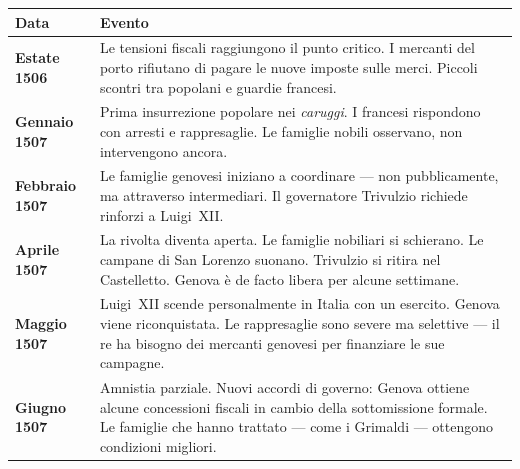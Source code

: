 \begin{center}
\begin{tabularx}{\textwidth}{L{3.2cm} X}
  \toprule
  \textbf{Data} & \textbf{Evento} \\
  \midrule
  \textbf{Estate 1506} &
    Le tensioni fiscali raggiungono il punto critico. I mercanti del porto
    rifiutano di pagare le nuove imposte sulle merci. Piccoli scontri tra
    popolani e guardie francesi. \\

  \textbf{Gennaio 1507} &
    Prima insurrezione popolare nei \textit{caruggi}. I francesi rispondono
    con arresti e rappresaglie. Le famiglie nobili osservano, non intervengono
    ancora. \\

  \textbf{Febbraio 1507} &
    Le famiglie genovesi iniziano a coordinare — non pubblicamente, ma
    attraverso intermediari. Il governatore Trivulzio richiede rinforzi
    a Luigi~XII. \\

  \textbf{Aprile 1507} &
    La rivolta diventa aperta. Le famiglie nobiliari si schierano.
    Le campane di San Lorenzo suonano. Trivulzio si ritira nel Castelletto.
    Genova è de facto libera per alcune settimane. \\

  \textbf{Maggio 1507} &
    Luigi~XII scende personalmente in Italia con un esercito. Genova viene
    riconquistata. Le rappresaglie sono severe ma selettive — il re ha
    bisogno dei mercanti genovesi per finanziare le sue campagne. \\

  \textbf{Giugno 1507} &
    Amnistia parziale. Nuovi accordi di governo: Genova ottiene alcune
    concessioni fiscali in cambio della sottomissione formale.
    Le famiglie che hanno trattato — come i Grimaldi — ottengono
    condizioni migliori. \\
  \bottomrule
\end{tabularx}
\end{center}

